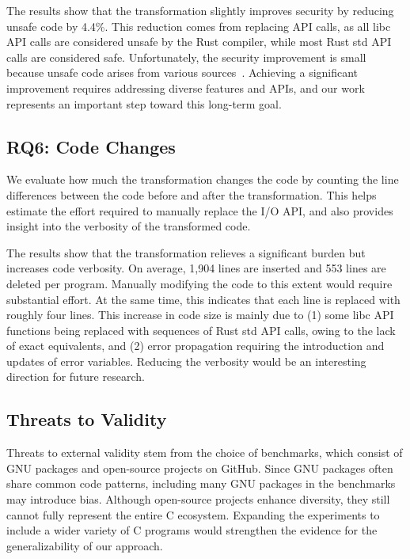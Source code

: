 The results show that the transformation slightly improves security by reducing
unsafe code by 4.4\%.
%
This reduction comes from replacing API calls, as all libc API calls are
considered unsafe by the Rust compiler, while most Rust std API calls are
considered safe.
%
Unfortunately, the security improvement is small because unsafe code arises from
various sources~\cite{emre2021translating}.
%
Achieving a significant improvement requires addressing diverse features and
APIs, and our work represents an important step toward this long-term goal.


\subsection{RQ6: Code Changes}
\label{sec:evaluation:code}

We evaluate how much the transformation changes the code by counting the line
differences between the code before and after the transformation.
%
This helps estimate the effort required to manually replace the I/O API, and
also
provides insight into the verbosity of the transformed code.

The results show that the transformation relieves a significant burden but
increases code verbosity.
%
On average, 1,904 lines are inserted and 553 lines are deleted per program.
%
Manually modifying the code to this extent would require substantial effort.
%
At the same time, this indicates that each line is replaced with roughly four
lines.
%
This increase in code size is mainly due to
%
(1) some libc API functions being replaced with sequences of Rust std API calls,
owing to the lack of exact equivalents, and
%
(2) error propagation requiring the introduction and updates of error variables.
%
Reducing the verbosity would be an interesting direction for future research.

\subsection{Threats to Validity}
\label{sec:evaluation:threats}

Threats to external validity stem from the choice of benchmarks, which consist
of GNU packages and open-source projects on GitHub.
%
Since GNU packages often share common code patterns, including many GNU packages
in the benchmarks may introduce bias.
%
Although open-source projects enhance diversity, they still cannot fully
represent the entire C ecosystem.
%
Expanding the experiments to include a wider variety of C programs would
strengthen the evidence for the generalizability of our approach.

